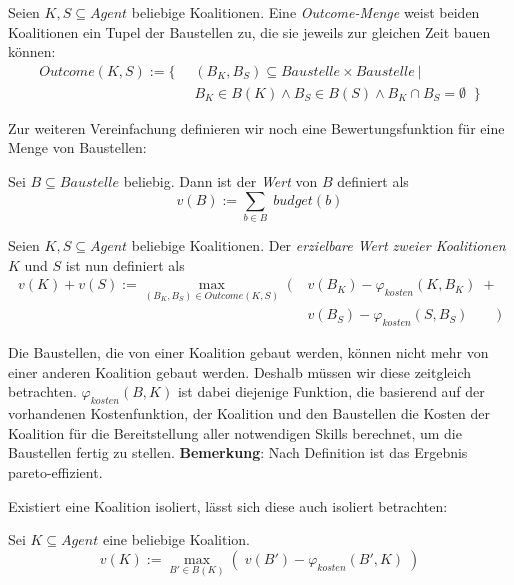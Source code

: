 \begin{definition}
  Seien $K, S \subseteq Agent$ beliebige Koalitionen. Eine \textit{Outcome-Menge} weist beiden Koalitionen ein Tupel der Baustellen zu, die sie jeweils zur gleichen Zeit bauen können:
\begin{align}
  Outcome(K,S) := \{ \; \;
  &(B_K,B_S)\subseteq Baustelle\times Baustelle\ | \\
  &B_K\in B(K) \land B_S\in B(S)\land B_K\cap B_S =\emptyset \;\;\}
\end{align}
\end{definition}

\noindent
Zur weiteren Vereinfachung definieren wir noch eine Bewertungsfunktion für eine Menge von Baustellen:

\begin{definition}
  Sei $B\subseteq Baustelle$ beliebig. Dann ist der \textit{Wert} von $B$ definiert als
  \begin{equation}
    v(B):=\sum_{b \in B} \; budget(b)
  \end{equation}
\end{definition}

\begin{definition}
  Seien $K, S \subseteq Agent$ beliebige Koalitionen. Der \textit{erzielbare Wert zweier Koalitionen} $K$ und $S$ ist nun definiert als
\begin{align}
  v(K) + v(S) := \max_{(B_K, B_S)\in Outcome(K,S)} \;(\;
  &v(B_K) - \varphi_{kosten}(K, B_K) \;+ \\ &v(B_S) - \varphi_{kosten}(S, B_S) \qquad)
\end{align}

\noindent
Die Baustellen, die von einer Koalition gebaut werden, können nicht mehr von einer anderen Koalition gebaut werden. Deshalb müssen wir diese zeitgleich betrachten.
$\varphi_{kosten}(B,K)$ ist dabei diejenige Funktion, die basierend auf der vorhandenen Kostenfunktion, der Koalition und den Baustellen die Kosten der Koalition für die Bereitstellung aller notwendigen Skills berechnet, um die Baustellen fertig zu stellen.
\textbf{Bemerkung}: Nach Definition ist das Ergebnis pareto-effizient.
\end{definition}

\noindent
Existiert eine Koalition isoliert, lässt sich diese auch isoliert betrachten:
\begin{definition}
  Sei $K \subseteq Agent$ eine beliebige Koalition.
  \begin{equation}
    v(K) := \max_{B'\in B(K)} \left(\; v(B') - \varphi_{kosten}(B', K) \;\right)
  \end{equation}
\end{definition}

